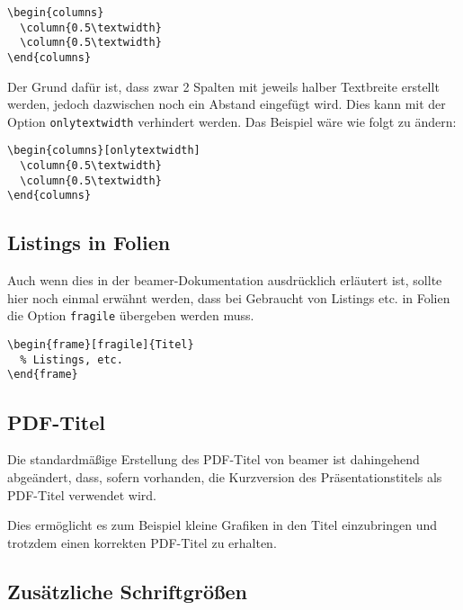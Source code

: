 \begin{lstlisting}
\begin{columns}
  \column{0.5\textwidth}
  \column{0.5\textwidth}
\end{columns}
\end{lstlisting}

Der Grund dafür ist, dass zwar 2 Spalten mit jeweils halber Textbreite erstellt
werden, jedoch dazwischen noch ein Abstand eingefügt wird. Dies kann mit der
Option \lstinline{onlytextwidth} verhindert werden.
Das Beispiel wäre wie folgt zu ändern:

\begin{lstlisting}[morekeywords={onlytextwidth},keywordstyle=\color{tuOrange}]
\begin{columns}[onlytextwidth]
  \column{0.5\textwidth}
  \column{0.5\textwidth}
\end{columns}
\end{lstlisting}


\subsection{Listings in Folien}

Auch wenn dies in der beamer-Dokumentation ausdrücklich erläutert ist,
sollte hier noch einmal erwähnt werden, dass bei Gebraucht von Listings etc.
in Folien die Option \lstinline{fragile} übergeben werden muss.

\begin{lstlisting}
\begin{frame}[fragile]{Titel}
  % Listings, etc.
\end{frame}
\end{lstlisting}



\subsection{PDF-Titel}

Die standardmäßige Erstellung des PDF-Titel von beamer ist dahingehend
abgeändert, dass, sofern vorhanden, die Kurzversion des Präsentationstitels
als PDF-Titel verwendet wird.

Dies ermöglicht es zum Beispiel kleine Grafiken in den Titel einzubringen und
trotzdem einen korrekten PDF-Titel zu erhalten.


\subsection{Zusätzliche Schriftgrößen}

